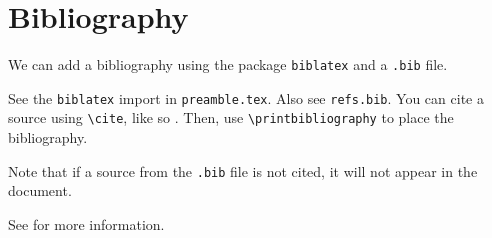 \documentclass{article}
\begin{document}
\section{Bibliography}

We can add a bibliography using the package \texttt{biblatex} and a \texttt{.bib} file.

See the \texttt{biblatex} import in \texttt{preamble.tex}. Also see \texttt{refs.bib}. You can cite a source using \texttt{\textbackslash cite}, like so \cite{latex_vid_1} \cite{latex_vid_2}. Then, use \texttt{\textbackslash printbibliography} to place the bibliography.

Note that if a source from the \texttt{.bib} file is not cited, it will not appear in the document.

See \cite{overleaf_bibliography} for more information.

\newpage
\printbibliography
\end{document}
